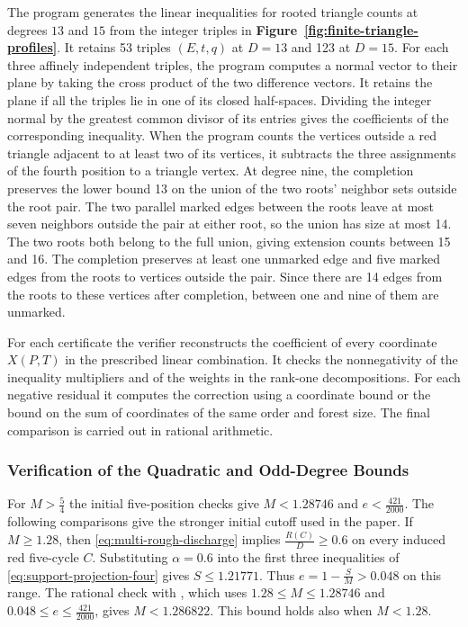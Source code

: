 \documentclass[preprint,11pt,numbers]{elsarticle-arxiv}
\numberwithin{equation}{section}
\theoremstyle{definition}
\begin{document}
The program  generates the
linear inequalities for rooted triangle counts at degrees $13$
and $15$ from the integer triples in
\textbf{Figure~\ref{fig:finite-triangle-profiles}}. It retains 53 triples
$(E,t,q)$ at $D=13$ and 123 at $D=15$. For each three affinely independent
triples, the program computes a normal vector to their plane by taking
the cross product of the two difference vectors. It retains the plane
if all the triples lie in one of its closed half-spaces. Dividing the
integer normal by the greatest common divisor of its entries gives the
coefficients of the corresponding inequality.
When the program counts the vertices outside a red triangle
adjacent to at least two of its vertices, it subtracts the three
assignments of the fourth position to a triangle vertex. At degree
nine, the completion preserves the lower bound 13 on the union
of the two roots' neighbor sets outside the root pair. The two
parallel marked edges between the roots leave at most seven
neighbors outside the pair at either root, so the union has size
at most 14. The two roots both belong to the full union, giving
extension counts between 15 and 16. The completion preserves at
least one unmarked edge and five marked edges from the roots to
vertices outside the pair. Since there are 14 edges from the
roots to these vertices after completion, between one and nine
of them are unmarked.

For each certificate the verifier reconstructs the coefficient
of every coordinate $X(P,T)$ in the prescribed linear combination.
It checks the nonnegativity of the inequality multipliers and of
the weights in the rank-one decompositions. For each negative
residual it computes the correction using a coordinate bound or
the bound on the sum of coordinates of the same order and forest
size. The final comparison is carried out in rational arithmetic.

\subsubsection{Verification of the Quadratic and Odd-Degree Bounds}\label{app:weighted-final-checks}

For $M>\frac{5}{4}$ the initial five-position checks give
$M<1.28746$ and $e<\frac{421}{2000}$. The following comparisons
give the stronger initial cutoff used in the paper. If
$M\geq1.28$, then \eqref{eq:multi-rough-discharge} implies
$\frac{R(C)}{D}\geq0.6$ on every induced red five-cycle $C$.
Substituting $\alpha=0.6$ into the first three inequalities
of \eqref{eq:support-projection-four} gives $S\leq1.21771$.
Thus $e=1-\frac{S}{M}>0.048$ on this range. The rational check
with , which uses
$1.28\leq M\leq1.28746$ and $0.048\leq e\leq\frac{421}{2000}$,
gives $M<1.286822$. This bound holds also when $M<1.28$.
\end{document}
